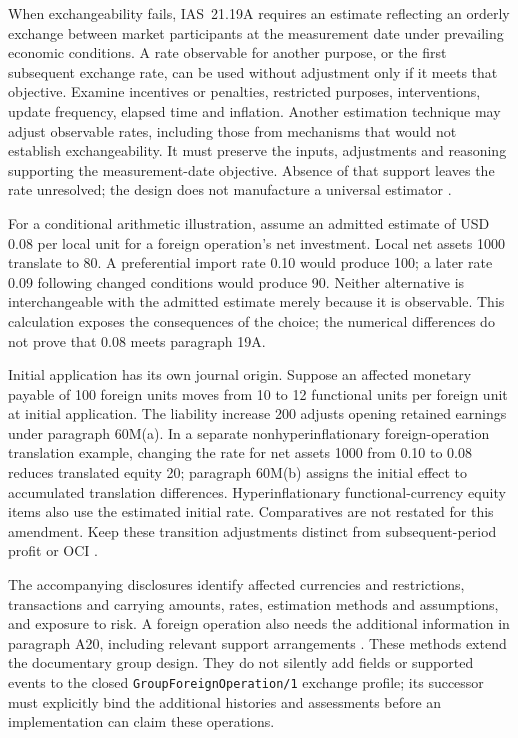 When exchangeability fails, IAS~21.19A requires an estimate reflecting an
orderly exchange between market participants at the measurement date under
prevailing economic conditions. A rate observable for another purpose, or
the first subsequent exchange rate, can be used without adjustment only
if it meets that objective. Examine incentives or penalties, restricted
purposes, interventions, update frequency, elapsed time and inflation.
Another estimation technique may adjust observable rates, including those
from mechanisms that would not establish exchangeability. It must preserve
the inputs, adjustments and reasoning supporting the measurement-date
objective. Absence of that support leaves the rate unresolved; the design
does not manufacture a universal estimator
\citep[IAS~21.A11--A17]{eu20242862}.

For a conditional arithmetic illustration, assume an admitted estimate of
USD 0.08 per local unit for a foreign operation's net investment. Local net
assets 1000 translate to 80. A preferential import rate 0.10 would produce 100;
a later rate 0.09 following changed conditions would produce 90. Neither
alternative is interchangeable with the admitted estimate merely because it
is observable. This calculation exposes the consequences of the choice;
the numerical differences do not prove that 0.08 meets paragraph 19A.

Initial application has its own journal origin. Suppose an affected monetary
payable of 100 foreign units moves from 10 to 12 functional units per foreign
unit at initial application. The liability increase 200 adjusts opening
retained earnings under paragraph 60M(a). In a separate nonhyperinflationary
foreign-operation translation example, changing the rate for net assets 1000
from 0.10 to 0.08 reduces translated equity 20; paragraph 60M(b) assigns the
initial effect to accumulated translation differences. Hyperinflationary
functional-currency equity items also use the estimated initial rate.
Comparatives are not restated for this amendment. Keep these transition
adjustments distinct from subsequent-period profit or OCI
\citep[IAS~21.60M]{eu20242862}.

The accompanying disclosures identify affected currencies and restrictions,
transactions and carrying amounts, rates, estimation methods and assumptions,
and exposure to risk. A foreign operation also needs the additional
information in paragraph A20, including relevant support arrangements
\citep[IAS~21.57A--B, A18--A20]{eu20242862}.
These methods extend the documentary group design. They do not silently add
fields or supported events to the closed \texttt{GroupForeignOperation/1}
exchange profile; its successor must explicitly bind the additional histories
and assessments before an implementation can claim these operations.

